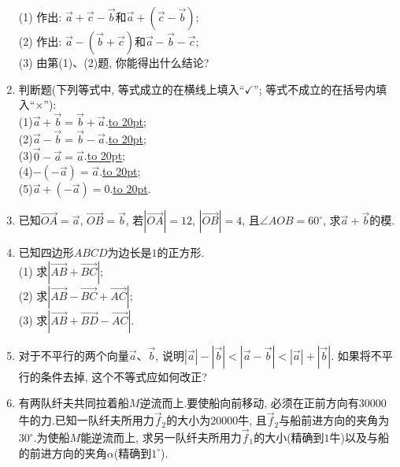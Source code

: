 \documentclass[10pt,a4paper]{article}
\newcommand{\blank}[1]{\underline{\hbox to #1pt{}}}
\begin{document}
\begin{enumerate}[1.]
\begin{center}
\end{center}
(1) 作出: $\overrightarrow a+\overrightarrow c-\overrightarrow b$和$\overrightarrow a+(\overrightarrow c-\overrightarrow b)$;\\
(2) 作出: $\overrightarrow a-(\overrightarrow b+\overrightarrow c)$和$\overrightarrow a-\overrightarrow b-\overrightarrow c$;\\
(3) 由第(1)、(2)题, 你能得出什么结论?
\item 判断题(下列等式中, 等式成立的在横线上填入``$\checkmark$''; 等式不成立的在括号内填入``$\times$''):\\
(1)$\overrightarrow a+\overrightarrow b=\overrightarrow b+\overrightarrow a$.\blank{20};\\
(2)$\overrightarrow a-\overrightarrow b=\overrightarrow b-\overrightarrow a$.\blank{20};\\
(3)$\overrightarrow 0-\overrightarrow a=\overrightarrow a$.\blank{20};\\
(4)$-(-\overrightarrow a)=\overrightarrow a$.\blank{20};\\
(5)$\overrightarrow a+(-\overrightarrow a)=0$.\blank{20}.
\item 已知$\overrightarrow{OA}=\overrightarrow a$, $\overrightarrow{OB}=\overrightarrow b$, 若$|\overrightarrow{OA}|=12$, $|\overrightarrow{OB}|=4$, 且$\angle AOB=60^{\circ }$, 求$\overrightarrow a+\overrightarrow b$的模.
\item 已知四边形$ABCD$为边长是$1$的正方形.\\
(1) 求$|\overrightarrow{AB}+\overrightarrow{BC}|$;\\
(2) 求$|\overrightarrow{AB}-\overrightarrow{BC}+\overrightarrow{AC}|$;\\
(3) 求$|\overrightarrow{AB}+\overrightarrow{BD}-\overrightarrow{AC}|$.
\item 对于不平行的两个向量$\overrightarrow a$、$\overrightarrow b$, 说明$|\overrightarrow a|-|\overrightarrow b|<|\overrightarrow a-\overrightarrow b|<|\overrightarrow a|+|\overrightarrow b|$.
如果将不平行的条件去掉, 这个不等式应如何改正?
\item 有两队纤夫共同拉着船$M$逆流而上.要使船向前移动, 必须在正前方向有$30000$牛的力.已知一队纤夫所用力$\overrightarrow f_2$的大小为$20000$牛, 且$\overrightarrow f_2$与船前进方向的夹角为$30^{\circ }$.为使船$M$能逆流而上, 求另一队纤夫所用力$\overrightarrow f_1$的大小(精确到$1$牛)以及与船的前进方向的夹角$\alpha$(精确到$1^{\circ }$).
\begin{center}
    \begin{tikzpicture}[thick,>=latex,scale = 1.5]

\end{tikzpicture}
\end{center}
\end{enumerate}
\end{document}
